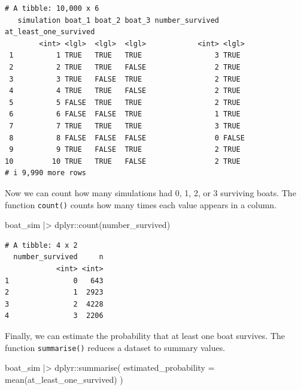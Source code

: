 \documentclass[
  letterpaper,
  DIV=11,
  numbers=noendperiod]{scrreprt}
\newenvironment{Shaded}{\begin{snugshade}}{\end{snugshade}}
\newcommand{\AttributeTok}[1]{\textcolor[rgb]{0.40,0.45,0.13}{#1}}
\newcommand{\FunctionTok}[1]{\textcolor[rgb]{0.28,0.35,0.67}{#1}}
\newcommand{\NormalTok}[1]{\textcolor[rgb]{0.00,0.23,0.31}{#1}}
\newcommand{\SpecialCharTok}[1]{\textcolor[rgb]{0.37,0.37,0.37}{#1}}
\begin{document}
\begin{verbatim}
# A tibble: 10,000 x 6
   simulation boat_1 boat_2 boat_3 number_survived at_least_one_survived
        <int> <lgl>  <lgl>  <lgl>            <int> <lgl>                
 1          1 TRUE   TRUE   TRUE                 3 TRUE                 
 2          2 TRUE   TRUE   FALSE                2 TRUE                 
 3          3 TRUE   FALSE  TRUE                 2 TRUE                 
 4          4 TRUE   TRUE   FALSE                2 TRUE                 
 5          5 FALSE  TRUE   TRUE                 2 TRUE                 
 6          6 FALSE  FALSE  TRUE                 1 TRUE                 
 7          7 TRUE   TRUE   TRUE                 3 TRUE                 
 8          8 FALSE  FALSE  FALSE                0 FALSE                
 9          9 TRUE   FALSE  TRUE                 2 TRUE                 
10         10 TRUE   TRUE   FALSE                2 TRUE                 
# i 9,990 more rows
\end{verbatim}

Now we can count how many simulations had 0, 1, 2, or 3 surviving boats.
The function \texttt{count()} counts how many times each value appears
in a column.

\begin{Shaded}
\begin{Highlighting}[]
\NormalTok{boat\_sim }\SpecialCharTok{|\textgreater{}}
\NormalTok{  dplyr}\SpecialCharTok{::}\FunctionTok{count}\NormalTok{(number\_survived)}
\end{Highlighting}
\end{Shaded}

\begin{verbatim}
# A tibble: 4 x 2
  number_survived     n
            <int> <int>
1               0   643
2               1  2923
3               2  4228
4               3  2206
\end{verbatim}

Finally, we can estimate the probability that at least one boat
survives. The function \texttt{summarise()} reduces a dataset to summary
values.

\begin{Shaded}
\begin{Highlighting}[]
\NormalTok{boat\_sim }\SpecialCharTok{|\textgreater{}}
\NormalTok{  dplyr}\SpecialCharTok{::}\FunctionTok{summarise}\NormalTok{(}
    \AttributeTok{estimated\_probability =} \FunctionTok{mean}\NormalTok{(at\_least\_one\_survived)}
\NormalTok{  )}
\end{Highlighting}
\end{Shaded}
\end{document}
